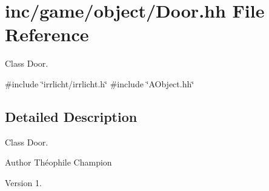 \hypertarget{Door_8hh}{}\section{inc/game/object/\+Door.hh File Reference}
\label{Door_8hh}


Class Door.  


{\ttfamily \#include \char`\"{}irrlicht/irrlicht.\+h\char`\"{}}\newline
{\ttfamily \#include \char`\"{}A\+Object.\+hh\char`\"{}}\newline


\subsection{Detailed Description}
Class Door. 

\begin{DoxyAuthor}{Author}
Théophile Champion 
\end{DoxyAuthor}
\begin{DoxyVersion}{Version}
1. 
\end{DoxyVersion}
